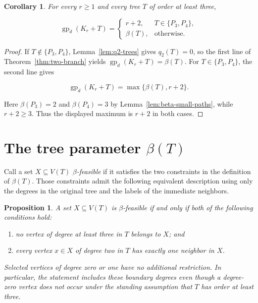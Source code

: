 \documentclass[11pt,a4paper]{article}
\providecommand{\tightlist}{%
  \setlength{\itemsep}{0pt}\setlength{\parskip}{0pt}}
\newtheorem{corollary}[theorem]{Corollary}
\newtheorem{proposition}[theorem]{Proposition}
\numberwithin{equation}{section}
\begin{document}
\begin{corollary}\label{cor:main-formula}
For every \(r\ge 1\) and every tree \(T\) of
order at least three,

\[
\operatorname{gp}_d(K_r+T)=
\begin{cases}
r+2,&T\in\{P_3,P_4\},\\
\beta(T),&\text{otherwise}.
\end{cases}
\]
\end{corollary}

\begin{proof}
If \(T\notin\{P_3,P_4\}\), Lemma~\ref{lem:q2-trees} gives \(q_2(T)=0\),
so the first line of Theorem~\ref{thm:two-branch} yields
\(\operatorname{gp}_d(K_r+T)=\beta(T)\). For \(T\in\{P_3,P_4\}\), the
second line gives

\[
\operatorname{gp}_d(K_r+T)=\max\{\beta(T),r+2\}.
\]

Here \(\beta(P_3)=2\) and \(\beta(P_4)=3\) by Lemma~\ref{lem:beta-small-paths}, while
\(r+2\ge 3\). Thus the displayed maximum is \(r+2\) in both cases.
\end{proof}

\section{The tree parameter \texorpdfstring{$\beta(T)$}{beta(T)}}\label{sec:beta}

Call a set \(X\subseteq V(T)\) \emph{\(\beta\)-feasible} if it satisfies
the two constraints in the definition of \(\beta(T)\). Those constraints
admit the following equivalent description using only the degrees in the
original tree and the labels of the immediate neighbors.

\begin{proposition}\label{prop:local-characterization}
A set \(X\subseteq V(T)\) is
\(\beta\)-feasible if and only if both of the following conditions hold:

\begin{enumerate}
\def\labelenumi{\arabic{enumi}.}
\tightlist
\item
  no vertex of degree at least three in \(T\) belongs to \(X\); and
\item
  every vertex \(x\in X\) of degree two in \(T\) has exactly one
  neighbor in \(X\).
\end{enumerate}

Selected vertices of degree zero or one have no additional restriction.
In particular, the statement includes these boundary degrees even though
a degree-zero vertex does not occur under the standing assumption that
\(T\) has order at least three.
\end{proposition}
\end{document}
